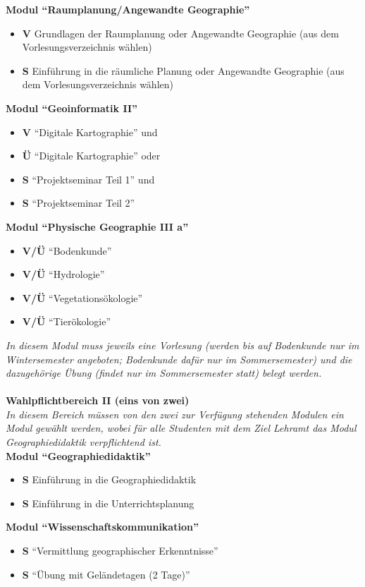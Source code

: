 \textbf{Modul "`Raumplanung/Angewandte Geographie"'}
	\begin{itemize}
		\item \textbf{V} Grundlagen der Raumplanung oder Angewandte Geographie (aus dem Vorlesungsverzeichnis wählen)
		\item \textbf{S} Einführung in die räumliche Planung oder Angewandte Geographie (aus dem Vorlesungsverzeichnis wählen)
	\end{itemize}


\textbf{Modul "`Geoinformatik II"'}
\begin{itemize}
	\item \textbf{V} "`Digitale Kartographie"' und
	\item \textbf{Ü} "`Digitale Kartographie"' oder
	\item \textbf{S} "`Projektseminar Teil 1"' und
	\item \textbf{S} "`Projektseminar Teil 2"'
\end{itemize}

\textbf{Modul "`Physische Geographie III a"'}
	\begin{itemize}
		\item \textbf{V/Ü} "`Bodenkunde"'
		\item \textbf{V/Ü} "`Hydrologie"'
		\item \textbf{V/Ü} "`Vegetationsökologie"'
		\item \textbf{V/Ü} "`Tierökologie"'
	\end{itemize}
\emph{In diesem Modul muss jeweils eine Vorlesung (werden bis auf Bodenkunde nur im Wintersemester angeboten; Bodenkunde dafür nur im Sommersemester) und die dazugehörige Übung (findet nur im Sommersemester statt) belegt werden.}\\\\
\textbf{Wahlpflichtbereich II (eins von zwei)}\\
\emph{In diesem Bereich müssen von den zwei zur Verfügung stehenden Modulen ein Modul gewählt werden, wobei für alle Studenten mit dem Ziel Lehramt das Modul Geographiedidaktik verpflichtend ist.}\\

\textbf{Modul "`Geographiedidaktik"'}
	\begin{itemize}
		\item \textbf{S} Einführung in die Geographiedidaktik
		\item \textbf{S} Einführung in die Unterrichtsplanung
	\end{itemize}

\textbf{Modul "`Wissenschaftskommunikation"'}
\begin{itemize}
	\item \textbf{S} "`Vermittlung geographischer Erkenntnisse"' 
	\item \textbf{S} "`Übung mit Geländetagen (2 Tage)"' 
\end{itemize}

